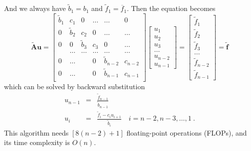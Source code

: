 \documentclass{article}
\begin{document}
	And we always have $\tilde{b}_1=b_1$ and $\tilde{f}_1=\overline{f}_1$. 
	Then the equation becomes 
	\begin{equation}
	\tilde{\mathbf{A}}\mathbf{u} = \begin{bmatrix}
	\tilde{b}_1& c_1& 0 &\dots   & \dots &0 \\
	0 & \tilde{b}_2 & c_2 &0 &\dots &\dots \\
	0&0 &\tilde{b}_3 & c_3 & 0 & \dots \\
	& \dots   & \dots &\dots   &\dots & \dots \\
	0&\dots   &  &0 &\tilde{b}_{n-2}& c_{n-2} \\
	0&\dots    &  & 0  &\tilde{b}_{n-1} & c_{n-1} \\
	\end{bmatrix}
	\begin{bmatrix}
	u_1 \\
	u_2 \\
	u_3 \\
	\dots \\
	u_{n-2} \\
	u_{n-1}
	\end{bmatrix}
	=
	\begin{bmatrix}
	\tilde{f}_1 \\
	\tilde{f}_2 \\
	\tilde{f}_3 \\
	\dots \\
	\tilde{f}_{n-2} \\
	\tilde{f}_{n-1}
	\end{bmatrix}
	=\tilde{\mathbf{f}}
	\end{equation}
	which can be solved by backward substitution 
	\begin{eqnarray}\label{backward}
	\nonumber
	u_{n-1}&=&\frac{\tilde{f}_{n-1}}{\tilde{b}_{n-1}} \\
	u_{i}&=&\frac{\tilde{f}_i-c_i u_{i+1}}{\tilde{b}_i}\quad i=n-2,n-3,\dots,1\ .
	\end{eqnarray}
	This algorithm needs $[8(n-2)+1]$ floating-point operations (FLOPs), and 
	its time complexity is $O(n)$. 
	
\end{document}
